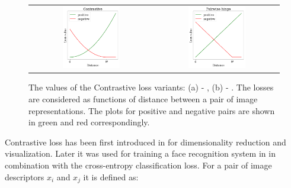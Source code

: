 \begin{figure}
\begin{center}
    \begin{tabular}{cc}
        \includegraphics[width=0.48\textwidth]{Figures/contrastive.png}&
        \includegraphics[width=0.48\textwidth]{Figures/pairwise_hinge.png}
    \end{tabular}
    \caption{The values of the Contrastive loss variants: (a) - , (b) - . The losses are considered as functions of distance between a pair of image representations. The plots for positive and negative pairs are shown in green and red correspondingly.}
    \label{fig:contrastive}
\end{center}
\end{figure}
Contrastive loss has been first introduced in \citep{hadsell2006dimensionality} for dimensionality reduction and visualization. Later it was used for training a face recognition system in \citep{Sun14} in combination with the cross-entropy classification loss. For a pair of image descriptors $x_i$ and $x_j$ it is defined as:

